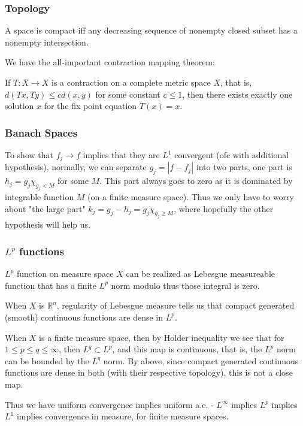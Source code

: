 \documentclass[main.tex]{subfiles}
\begin{document}
\subsubsection{Topology}
A space is compact iff any decreasing sequence of nonempty closed subset has a nonempty intersection.
 
We have the all-important contraction mapping theorem:
\begin{theorem}
If $T: X \rightarrow X$ is a contraction on a complete metric space $X$, that is, $d(Tx, Ty) \leq c d(x,y)$ for some constant $c \leq 1$, then there exists exactly one solution $x$ for the fix point equation $T(x) = x$.
\end{theorem}



\subsubsection{Banach Spaces}
To show that $f_j \rightarrow f$ implies that they are $L^1$ convergent (ofc with additional hypothesis), normally, we can separate $g_j = |f - f_j|$ into two parts, one part is $h_j = g_j \chi_{g_j < M}$ for some $M$. This part always goes to zero as it is dominated by integrable function $M$ (on a finite measure space). Thus we only have to worry about "the large part" $k_j = g_j - h_j = g_j \chi_{g_j \geq M}$, where hopefully the other hypothesis will help us.

\subsubsection{$L^p$ functions}

$L^p$ function on measure space $X$ can be realized as Lebesgue measureable function that has a finite $L^p$ norm modulo thus those integral is zero.

When $X$ is $\mathbb{R}^n$, regularity of Lebesgue measure tells us that compact generated (smooth) continuous functions are dense in $L^p$.

When $X$ is a finite measure space, then by Holder inequality we see that for $1 \leq p \leq q \leq \infty$, then $L^q \subset L^p$, and this map is continuous, that is, the $L^p$ norm can be bounded by the $L^q$ norm. By above, since compact generated continuous functions are dense in both (with their respective topology), this is not a close map.

Thus we have uniform convergence implies uniform a.e. - $L^\infty$ implies $L^p$ implies $L^1$ implies convergence in measure, for finite measure spaces.
\end{document}
